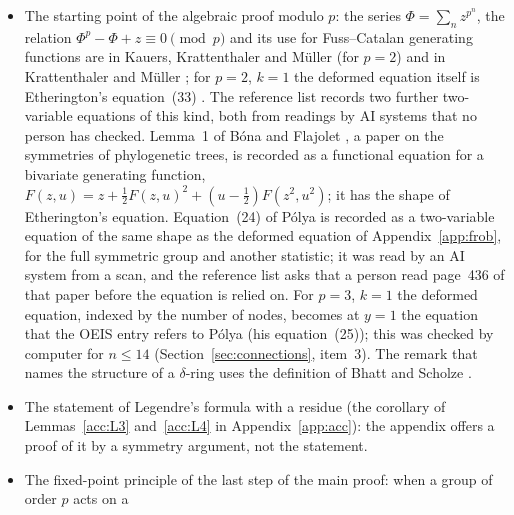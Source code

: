 \documentclass[11pt]{article}
\theoremstyle{definition}
\theoremstyle{remark}
\numberwithin{equation}{section}
\numberwithin{figure}{section}
\begin{document}
\begin{itemize}[itemsep=1pt]
 residue obtained in this way. As far as one search and these two readings show, it is a new proof of a
 classical theorem by a known method; that is a statement about what was found, not a proof that nothing else
 exists.
 One further paper is known to the project by its bibliographic record and its abstract only: Collins
 \cite{Collins}, whose abstract announces combinatorial proofs of some cases of Kummer's theorem, the case
 $p=2$ by permutations of binary vectors and arbitrary primes when there is no carry. A guest session met it
 in a web search on 14 November; it reached the project's reference list on the morning of 15 November and
 has not been read, so the proof of Appendix~\ref{app:path} has not been compared with it.
\item The starting point of the algebraic proof modulo $p$: the series $\Phi=\sum_nz^{p^n}$, the relation
 $\Phi^p-\Phi+z\equiv0\pmod p$ and its use for Fuss--Catalan generating functions are in Kauers,
 Krattenthaler and M\"uller \cite{KKM} (for $p=2$) and in Krattenthaler and M\"uller \cite{KM}; for $p=2$,
 $k=1$ the deformed equation itself is Etherington's equation~(33) \cite{Etherington}. The reference list
 records two further two-variable equations of this kind, both from readings by AI systems that no person
 has checked. Lemma~1 of B\'ona and Flajolet \cite{BonaFlajolet}, a paper on the symmetries of phylogenetic
 trees, is recorded as a functional equation for a bivariate generating function,
 $F(z,u)=z+\tfrac12F(z,u)^2+(u-\tfrac12)F(z^2,u^2)$; it has the shape of Etherington's equation. Equation~(24)
 of P\'olya \cite{Polya} is recorded as a two-variable equation of the same shape as the deformed equation of
 Appendix~\ref{app:frob}, for the full symmetric group and another statistic; it was read by an AI system
 from a scan, and the reference list asks that a person read page~436 of that paper before the equation is
 relied on. For $p=3$, $k=1$ the deformed equation, indexed by the number of nodes, becomes at $y=1$ the
 equation that the OEIS entry \cite{OEISA000625} refers to P\'olya (his equation~(25)); this was checked by
 computer for $n\le14$ (Section~\ref{sec:connections}, item~3). The remark that names
 the structure of a $\delta$-ring uses the definition of Bhatt and Scholze \cite{BhattScholze}.
\item The statement of Legendre's formula with a residue (the corollary of Lemmas~\ref{acc:L3}
 and~\ref{acc:L4} in Appendix~\ref{app:acc}): the appendix offers a proof of it by a symmetry argument, not
 the statement.
\item The fixed-point principle of the last step of the main proof: when a group of order $p$ acts on a

\end{itemize}
\end{document}
